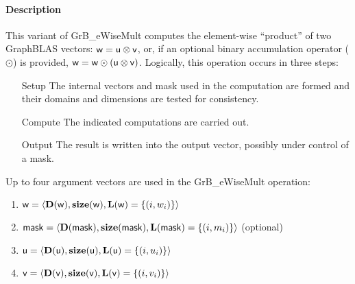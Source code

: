 \paragraph{Description}

This variant of {\sf GrB\_eWiseMult} computes the element-wise ``product'' of
two GraphBLAS vectors: ${\sf w} = {\sf u} \otimes {\sf v}$, or, if an optional
binary accumulation operator ($\odot$) is provided, ${\sf w} = {\sf w} \odot
\left({\sf u} \otimes {\sf v}\right)$.  Logically, this operation occurs in
three steps:
\begin{enumerate}[leftmargin=0.75in]
\item[Setup] The internal vectors and mask used in the computation are formed 
and their domains and dimensions are tested for consistency.
\item[Compute] The indicated computations are carried out.
\item[Output] The result is written into the output vector, possibly under 
control of a mask.
\end{enumerate}

Up to four argument vectors are used in the {\sf GrB\_eWiseMult} operation:
\begin{enumerate}
	\item ${\sf w} = \langle \bold{D}({\sf w}),\bold{size}({\sf w}),\bold{L}({\sf w}) = \{(i,w_i) \} \rangle$
	\item ${\sf mask} = \langle \bold{D}({\sf mask}),\bold{size}({\sf mask}),\bold{L}({\sf mask}) = \{(i,m_i) \} \rangle$ (optional)
	\item ${\sf u} = \langle \bold{D}({\sf u}),\bold{size}({\sf u}),\bold{L}({\sf u}) = \{(i,u_i) \} \rangle$
	\item ${\sf v} = \langle \bold{D}({\sf v}),\bold{size}({\sf v}),\bold{L}({\sf v}) = \{(i,v_i) \} \rangle$
\end{enumerate}

